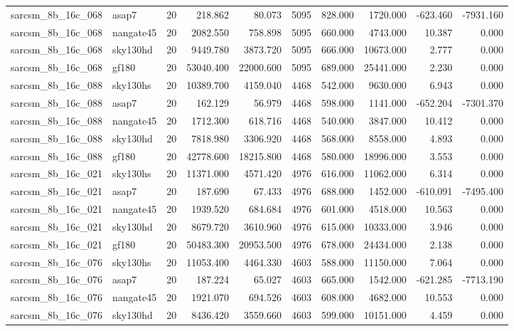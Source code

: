 \documentclass{article}
\begin{document}
\begin{longtable}{llrrrrrrrr}
sarcsm\_8b\_16c\_068 & asap7 & 20 & 218.862 & 80.073 & 5095 & 828.000 & 1720.000 & -623.460 & -7931.160 \\
sarcsm\_8b\_16c\_068 & nangate45 & 20 & 2082.550 & 758.898 & 5095 & 660.000 & 4743.000 & 10.387 & 0.000 \\
sarcsm\_8b\_16c\_068 & sky130hd & 20 & 9449.780 & 3873.720 & 5095 & 666.000 & 10673.000 & 2.777 & 0.000 \\
sarcsm\_8b\_16c\_068 & gf180 & 20 & 53040.400 & 22000.600 & 5095 & 689.000 & 25441.000 & 2.230 & 0.000 \\
sarcsm\_8b\_16c\_088 & sky130hs & 20 & 10389.700 & 4159.040 & 4468 & 542.000 & 9630.000 & 6.943 & 0.000 \\
sarcsm\_8b\_16c\_088 & asap7 & 20 & 162.129 & 56.979 & 4468 & 598.000 & 1141.000 & -652.204 & -7301.370 \\
sarcsm\_8b\_16c\_088 & nangate45 & 20 & 1712.300 & 618.716 & 4468 & 540.000 & 3847.000 & 10.412 & 0.000 \\
sarcsm\_8b\_16c\_088 & sky130hd & 20 & 7818.980 & 3306.920 & 4468 & 568.000 & 8558.000 & 4.893 & 0.000 \\
sarcsm\_8b\_16c\_088 & gf180 & 20 & 42778.600 & 18215.800 & 4468 & 580.000 & 18996.000 & 3.553 & 0.000 \\
sarcsm\_8b\_16c\_021 & sky130hs & 20 & 11371.000 & 4571.420 & 4976 & 616.000 & 11062.000 & 6.314 & 0.000 \\
sarcsm\_8b\_16c\_021 & asap7 & 20 & 187.690 & 67.433 & 4976 & 688.000 & 1452.000 & -610.091 & -7495.400 \\
sarcsm\_8b\_16c\_021 & nangate45 & 20 & 1939.520 & 684.684 & 4976 & 601.000 & 4518.000 & 10.563 & 0.000 \\
sarcsm\_8b\_16c\_021 & sky130hd & 20 & 8679.720 & 3610.960 & 4976 & 615.000 & 10333.000 & 3.946 & 0.000 \\
sarcsm\_8b\_16c\_021 & gf180 & 20 & 50483.300 & 20953.500 & 4976 & 678.000 & 24434.000 & 2.138 & 0.000 \\
sarcsm\_8b\_16c\_076 & sky130hs & 20 & 11053.400 & 4464.330 & 4603 & 588.000 & 11150.000 & 7.064 & 0.000 \\
sarcsm\_8b\_16c\_076 & asap7 & 20 & 187.224 & 65.027 & 4603 & 665.000 & 1542.000 & -621.285 & -7713.190 \\
sarcsm\_8b\_16c\_076 & nangate45 & 20 & 1921.070 & 694.526 & 4603 & 608.000 & 4682.000 & 10.553 & 0.000 \\
sarcsm\_8b\_16c\_076 & sky130hd & 20 & 8436.420 & 3559.660 & 4603 & 599.000 & 10151.000 & 4.459 & 0.000 \\

\end{longtable}
\end{document}
